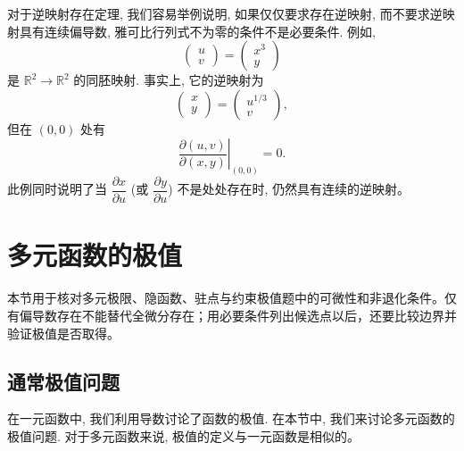 \documentclass[12pt,fontset=fandol]{ctexart}
\begin{document}
\noindent{}\quad 对于逆映射存在定理, 我们容易举例说明, 如果仅仅要求存在逆映射, 而不要求逆映射具有连续偏导数, 雅可比行列式不为零的条件不是必要条件. 例如,
\[
  \begin{pmatrix}
    u\\
    v
  \end{pmatrix}
  =
  \begin{pmatrix}
    x^3\\
    y
  \end{pmatrix}
\]
是 $\mathbb R^2\to\mathbb R^2$ 的同胚映射. 事实上, 它的逆映射为
\[
  \begin{pmatrix}
    x\\
    y
  \end{pmatrix}
  =
  \begin{pmatrix}
    u^{1/3}\\
    v
  \end{pmatrix},
\]
但在 $(0,0)$ 处有
\[
  \left.
  \frac{\partial(u,v)}{\partial(x,y)}
  \right|_{(0,0)}
  =0.
\]
此例同时说明了当 $\dfrac{\partial x}{\partial u}$ (或 $\dfrac{\partial y}{\partial u}$) 不是处处存在时, 仍然具有连续的逆映射。



\section{多元函数的极值}\label{course-14-5}
本节用于核对多元极限、隐函数、驻点与约束极值题中的可微性和非退化条件。仅有偏导数存在不能替代全微分存在；用必要条件列出候选点以后，还要比较边界并验证极值是否取得。

\subsection{通常极值问题}

在一元函数中, 我们利用导数讨论了函数的极值. 在本节中, 我们来讨论多元函数的极值问题. 对于多元函数来说, 极值的定义与一元函数是相似的。
\end{document}
